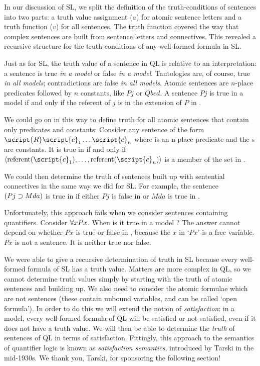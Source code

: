 In our discussion of SL, we split the definition of the truth-conditions of sentences into two parts: a truth value assignment ($a$) for atomic sentence letters and a truth function ($v$) for all sentences. The truth function covered the way that complex sentences are built from sentence letters and connectives. This revealed a recursive structure for the truth-conditions of any well-formed formula in SL. 

Just as for SL, the truth value of a sentence in QL is relative to an interpretation: a sentence is true \emph{in a model} or false \textit{in a model}. Tautologies are, of course, true \textit{in all models}; contradictions are false \textit{in all models}. Atomic sentences are $n$-place predicates followed by $n$ constants, like $Pj$ or $Qbcd$. A sentence $Pj$ is true in a model  if and only if the referent of $j$ is in the extension of $P$ in .

We could go on in this way to define truth for all atomic sentences that contain only predicates and constants: Consider any sentence of the form $\script{R}\script{c}_1\ldots\script{c}_n$ where  is an n-place predicate and the s are constants. It is true in  if and only if ${\langle}\referent{\script{c}_1},\ldots,\referent{\script{c}_n}{\rangle}$ is a member of the set  in .

We could then determine the truth of sentences built up with sentential connectives in the same way we did for SL. For example, the sentence $(Pj \supset Mda)$ is true in  if either $Pj$ is false in  or $Mda$ is true in .

Unfortunately, this approach fails when we consider sentences containing quantifiers. Consider $\forall x Px$. When is it true in a model ? The answer cannot depend on whether $Px$ is true or false in , because the $x$ in `$Px$' is a free variable. $Px$ is not a sentence. It is neither true nor false.

We were able to give a recursive determination of truth in SL because every well-formed formula of SL has a truth value. Matters are more complex in QL, so we cannot determine truth values simply by starting with the truth of atomic sentences and building up. We also need to consider the atomic formulae which are not sentences (these contain unbound variables, and can be called `open formula'). In order to do this we will extend the notion of \emph{satisfaction}: in a model, every well-formed formula of QL will be satisfied or not satisfied, even if it does not have a truth value. We will then be able to determine the \emph{truth} of sentences of QL in terms of satisfaction. {\color{black} Fittingly, this approach to the semantics of quantifier logic is known as \textit{satisfaction semantics}, introduced by Tarski in the mid-1930s. We thank you, Tarski, for sponsoring the following section!}


